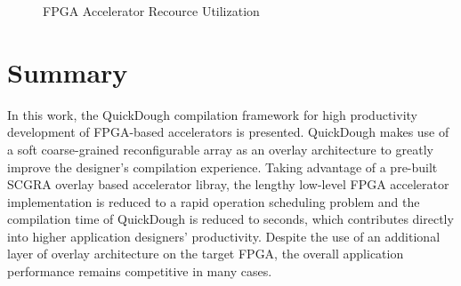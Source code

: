 \begin{figure}[htb]
\vspace{1em}
\caption{FPGA Accelerator Recource Utilization}
\label{fig:hw-overhead}
\end{figure}

\section{Summary}
In this work, the QuickDough compilation framework for high productivity development of FPGA-based accelerators is presented. QuickDough makes use of a soft coarse-grained reconfigurable array as an overlay architecture to greatly improve the designer's compilation experience. Taking advantage of a pre-built SCGRA overlay based accelerator libray, the lengthy low-level FPGA accelerator implementation is reduced to a rapid operation scheduling problem and the compilation time of QuickDough is reduced to seconds, which contributes directly into higher application designers' productivity. Despite the use of an additional layer of overlay architecture on the target FPGA, the overall application performance remains competitive in many cases.
